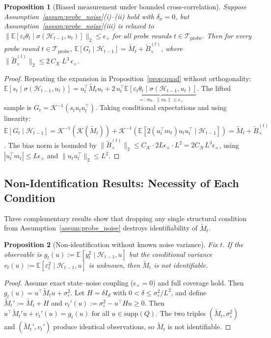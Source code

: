 \documentclass[11pt]{article}
\newcommand{\E}{\mathbb{E}}
\newcommand{\cH}{\mathcal{H}}
\newcommand{\cTprobe}{\mathcal{T}_{\mathrm{probe}}}
\newcommand{\supp}{\mathrm{supp}}
\newtheorem{proposition}{Proposition}
\begin{document}
\begin{proposition}[Biased measurement under bounded cross-correlation]
\label{prop:biased_cross_correlation}
Suppose Assumption~\ref{assum:probe_noise}(i)--(ii) hold with $\delta_\sigma=0$,
but Assumption~\ref{assum:probe_noise}(iii) is relaxed to
$\bigl\|\E[\varepsilon_t\theta_t\mid\sigma(\cH_{t-1},u_t)]\bigr\|_2
\le\epsilon_\times$ for all probe rounds $t\in\cTprobe$.
Then for every probe round $t\in\cTprobe$,
$\E[G_t\mid\cH_{t-1}] = \widetilde{M}_t + \widetilde{B}_\times^{(t)}$,
where $\|\widetilde{B}_\times^{(t)}\|_2\le 2\,C_{\mathcal{K}}\,L^3\,\epsilon_\times$.
\end{proposition}

\begin{proof}
Repeating the expansion in Proposition~\ref{prop:quad} without orthogonality:
$\E[s_t\mid\sigma(\cH_{t-1},u_t)]
= u_t^\top\widetilde{M}_t u_t
+ 2\,u_t^\top\underbrace{\E[\varepsilon_t\theta_t\mid\sigma(\cH_{t-1},u_t)]}_{=:m_t,\;\|m_t\|\le\epsilon_\times}$.
The lifted sample is $G_t=\mathcal{K}^{-1}(s_tu_tu_t^\top)$.
Taking conditional expectations and using linearity:
$\E[G_t\mid\cH_{t-1}]
= \mathcal{K}^{-1}(\mathcal{K}(\widetilde{M}_t))
+ \mathcal{K}^{-1}(\E[2(u_t^\top m_t)u_tu_t^\top\mid\cH_{t-1}])
= \widetilde{M}_t + \widetilde{B}_\times^{(t)}$.
The bias norm is bounded by
$\|\widetilde{B}_\times^{(t)}\|_2
\le C_{\mathcal{K}}\cdot 2L\epsilon_\times\cdot L^2
= 2C_{\mathcal{K}}L^3\epsilon_\times$,
using $|u_t^\top m_t|\le L\epsilon_\times$ and $\|u_tu_t^\top\|_2\le L^2$.
\end{proof}

\subsection{Non-Identification Results: Necessity of Each Condition}
\label{sec:id_necessity}

Three complementary results show that dropping any single structural condition from
Assumption~\ref{assum:probe_noise} destroys identifiability of $\widetilde{M}_t$.

\begin{proposition}[Non-identification without known noise variance]
\label{prop:nonid_a}
Fix $t$.  If the observable is $g_t(u):=\E[y_t^2\mid\cH_{t-1},u]$ but the conditional
variance $v_t(u):=\E[\varepsilon_t^2\mid\cH_{t-1},u]$ is unknown, then
$\widetilde{M}_t$ is not identifiable.
\end{proposition}

\begin{proof}
Assume exact state--noise coupling ($\epsilon_\times=0$) and full coverage hold.
Then $g_t(u)=u^\top\widetilde{M}_t u + \sigma_\varepsilon^2$.
Let $H=\delta I_d$ with $0<\delta\le\sigma_\varepsilon^2/L^2$, and define
$\widetilde{M}_t':=\widetilde{M}_t+H$ and
$v_t'(u):=\sigma_\varepsilon^2-u^\top Hu\ge 0$.
Then $u^\top\widetilde{M}_t' u + v_t'(u) = g_t(u)$ for all $u\in\supp(Q)$.
The two triples $(\widetilde{M}_t,\sigma_\varepsilon^2)$ and
$(\widetilde{M}_t',v_t')$ produce identical observations, so $\widetilde{M}_t$
is not identifiable.
\end{proof}
\end{document}
